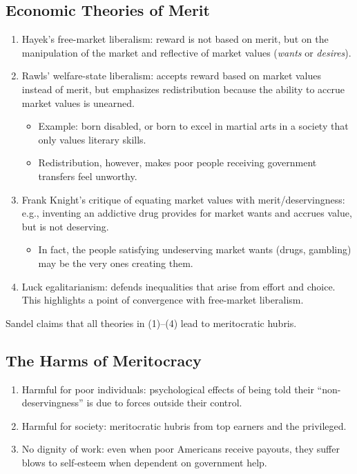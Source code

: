 \documentclass[12pt]{article}
\begin{document}
\subsection{Economic Theories of Merit}
\begin{enumerate}
    \item Hayek's free-market liberalism: reward is not based on merit, but on the manipulation of the market and reflective of market values (\emph{wants} or \emph{desires}).
    \item Rawls' welfare-state liberalism: accepts reward based on market values instead of merit, but emphasizes redistribution because the ability to accrue market values is unearned. 
    \begin{itemize}
        \item Example: born disabled, or born to excel in martial arts in a society that only values literary skills.
        \item Redistribution, however, makes poor people receiving government transfers feel unworthy.
    \end{itemize}
    \item Frank Knight's critique of equating market values with merit/deservingness: e.g., inventing an addictive drug provides for market wants and accrues value, but is not deserving. 
    \begin{itemize}
        \item In fact, the people satisfying undeserving market wants (drugs, gambling) may be the very ones creating them.
    \end{itemize}
    \item Luck egalitarianism: defends inequalities that arise from effort and choice. This highlights a point of convergence with free-market liberalism.
\end{enumerate}

Sandel claims that all theories in (1)--(4) lead to meritocratic hubris.

\subsection{The Harms of Meritocracy}
\begin{enumerate}
    \item Harmful for poor individuals: psychological effects of being told their ``non-deservingness'' is due to forces outside their control.
    \item Harmful for society: meritocratic hubris from top earners and the privileged.
    \item No dignity of work: even when poor Americans receive payouts, they suffer blows to self-esteem when dependent on government help.
\end{enumerate}
\end{document}
